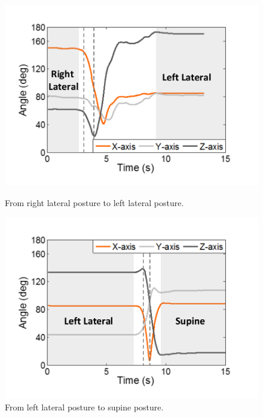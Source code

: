 \begin{figure}[!t]
\begin{minipage}[t]{0.31\linewidth}\centering
    \includegraphics[width=0.97\linewidth]{Figures/RightToLeft.pdf}
  \caption{From right lateral posture to left lateral posture.}\label{fig:RightToLeft}
\end{minipage}
\hspace{2pt}
\begin{minipage}[t]{0.31\linewidth}\centering
    \includegraphics[width=0.97\linewidth]{Figures/LeftToSupine.pdf}
  \caption{From  left lateral posture to supine posture.}\label{fig:LeftToSupine}
\end{minipage}
\hspace{2pt}
\begin{minipage}[t]{0.31\linewidth}\centering

\end{minipage}
\end{figure}
